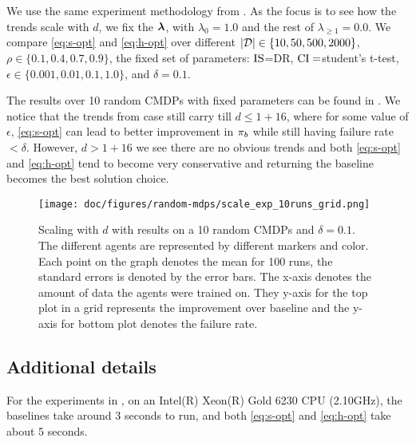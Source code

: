 We use the same experiment methodology from . As the focus is to see how the trends scale with $d$, we fix the $\bm{\lambda}$, with $\lambda_0=1.0$ and the rest of $\lambda_{\ge 1}=0.0$.  We compare \ref{eq:s-opt} and \ref{eq:h-opt} over different $|\mathcal{D}|\in \{ 10, 50, 500, 2000\}$, $\rho \in \{0.1, 0.4, 0.7, 0.9\}$, the fixed set of parameters: $\text{IS}$=DR, $\text{CI}=$student's t-test, $\epsilon\in \{0.001, 0.01, 0.1, 1.0\}$, and $\delta=0.1$.

The results over 10 random CMDPs with fixed parameters can be found in . We notice that the trends from  case still carry till $d\le 1+16$, where for some value of $\epsilon$, \ref{eq:s-opt} can lead to better improvement in $\pi_{b}$ while still having failure rate $<\delta$. However, $d > 1+16$ we see there are no obvious trends and both \ref{eq:s-opt} and \ref{eq:h-opt} tend to become very conservative and returning the baseline becomes the best solution choice.


\begin{figure*}
  \texttt{[image: doc/figures/random-mdps/scale\_exp\_10runs\_grid.png]}
  \caption{Scaling with $d$ with results on a 10 random CMDPs and $\delta=0.1$. The different agents are represented by different markers and color. Each point on the graph denotes the mean for 100 runs, the standard errors is denoted by the error bars. The x-axis denotes the amount of data the agents were trained on. They y-axis for the top plot in a grid represents the improvement over baseline and the y-axis for bottom plot denotes the failure rate.
  }
  \label{fig:scale-exp-10-runs-fixed-delta}
\end{figure*}


\subsection{Additional details}

For the experiments in , on an Intel(R) Xeon(R) Gold 6230 CPU (2.10GHz), the baselines take around 3 seconds to run, and both \ref{eq:s-opt} and \ref{eq:h-opt} take about 5 seconds.